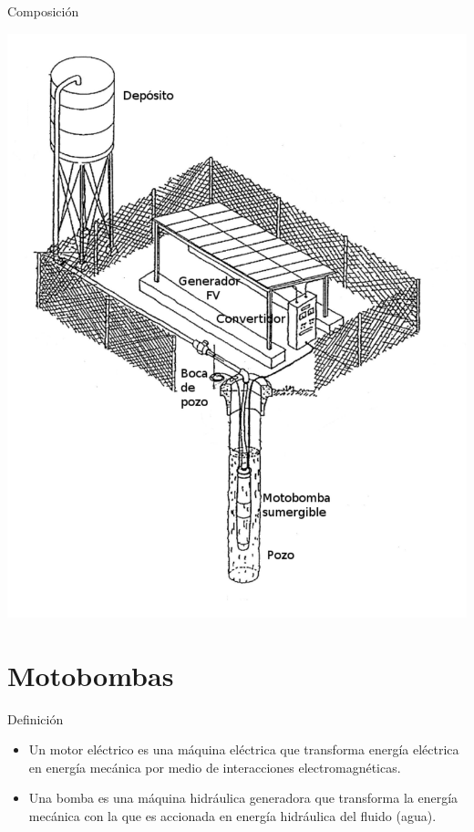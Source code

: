 \documentclass[xcolor={usenames,svgnames,dvipsnames}]{beamer}
\begin{document}
\begin{frame}[label={sec:orgf0cd28d}]{Composición}
\begin{center}
\includegraphics[height=\textheight]{../figs/EsquemaBombeo_oscar.pdf}
\end{center}
\end{frame}

\section{Motobombas}
\label{sec:org8196a21}

\begin{frame}[label={sec:org079e982}]{Definición}
\begin{itemize}
\item Un \alert{motor eléctrico} es una máquina eléctrica que \alert{transforma energía eléctrica en energía mecánica} por medio de interacciones electromagnéticas.

\item Una \alert{bomba} es una \alert{máquina hidráulica} generadora que \alert{transforma la energía mecánica} con la que es accionada \alert{en energía hidráulica del fluido} (agua).
\end{itemize}
\end{frame}
\end{document}
